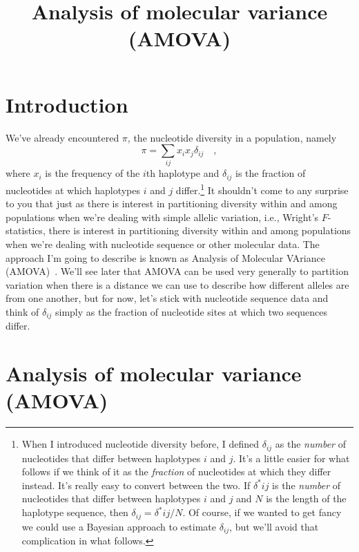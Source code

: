 \documentclass[12pt]{article}
\title{Analysis of molecular variance (AMOVA)}
\begin{document}
\maketitle

\thispagestyle{first}

\section*{Introduction}

We've already encountered $\pi$, the nucleotide diversity in a
population, namely
\[
\pi = \sum_{ij} x_ix_j \delta_{ij} \quad ,
\]
where $x_i$ is the frequency of the $i$th haplotype and $\delta_{ij}$
is the fraction of nucleotides at which haplotypes $i$ and $j$
differ.\footnote{When I introduced nucleotide diversity before, I
  defined $\delta_{ij}$ as the {\it number\/} of nucleotides that
  differ between haplotypes $i$ and $j$. It's a little easier for what
  follows if we think of it as the {\it fraction\/} of nucleotides at
  which they differ instead. It's really easy to convert between the
  two. If $\delta^*{ij}$ is the {\it number\/} of nucleotides that
  differ between haplotypes $i$ and $j$ and $N$ is the length of the
  haplotype sequence, then $\delta_{ij} = \delta^*{ij}/N$. Of course,
  if we wanted to get fancy we could use a Bayesian approach to
  estimate $\delta_{ij}$, but we'll avoid that complication in what
  follows.} It shouldn't come to any surprise to you that just as
there is interest in partitioning diversity within and among
populations when we're dealing with simple allelic variation, i.e.,
Wright's $F$-statistics, there is interest in partitioning diversity
within and among populations when we're dealing with nucleotide
sequence or other molecular data. The approach I'm going to describe
is known as Analysis of Molecular VAriance
(AMOVA)~\cite{Excoffier-etal92}. We'll see later that AMOVA can be
used very generally to partition variation when there is a distance we
can use to describe how different alleles are from one another, but
for now, let's stick with nucleotide sequence data and think of
$\delta_{ij}$ simply as the fraction of nucleotide sites at which two
sequences differ.

\section*{Analysis of molecular variance
  (AMOVA)}
\end{document}
